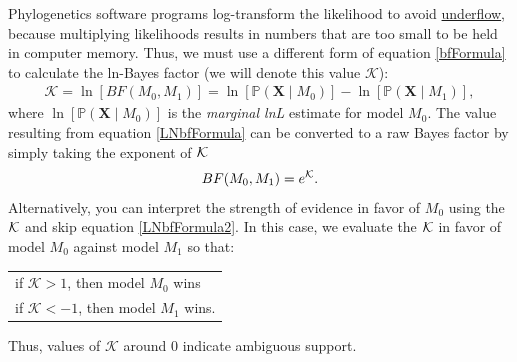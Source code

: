 \documentclass[11pt]{article}
\begin{document}
Phylogenetics software programs log-transform the likelihood to avoid \href{http://en.wikipedia.org/wiki/Arithmetic_underflow}{underflow}, because multiplying likelihoods results in numbers that are too small to be held in computer memory.
Thus, we must use a different form of equation \ref{bfFormula} to calculate the ln-Bayes factor (we will denote this value $\mathcal{K}$):
\begin{align}\label{LNbfFormula}
\mathcal{K}=\ln[BF(M_0,M_1)] = \ln[\mathbb{P}(\mathbf X \mid M_0)]-\ln[\mathbb{P}(\mathbf X \mid M_1)],
\end{align}
where $\ln[\mathbb{P}(\mathbf X \mid M_0)]$ is the \textit{marginal lnL} estimate for model $M_0$. 
The value resulting from equation \ref{LNbfFormula} can be converted to a raw Bayes factor by simply taking the exponent of $\cal{K}$
\begin{align}\label{LNbfFormula2}
BF(M_0,M_1) = e^{\cal{K}}.
\end{align}
Alternatively, you can interpret the strength of evidence in favor of $M_0$ using the $\cal{K}$ and skip equation \ref{LNbfFormula2}. 
In this case, we evaluate the $\cal{K}$ in favor of model $M_0$ against model $M_1$ so that:
\begin{center}
\begin{tabular}{l}
if $\mathcal{K} > 1$, then model $M_0$ wins\\
if $\mathcal{K} < -1$, then model $M_1$ wins.
\end{tabular}
\end{center}
Thus, values of $\mathcal{K}$ around 0 indicate ambiguous support. 

\end{document}
